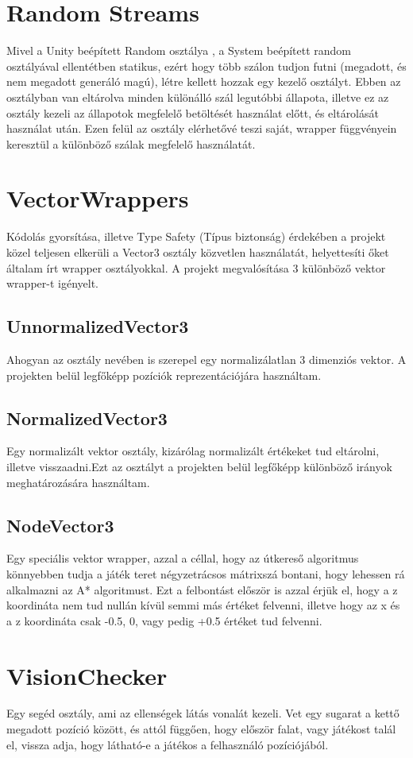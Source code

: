 \documentclass[
]{thesis-ekf}
\theoremstyle{definition}
\theoremstyle{remark}
\begin{document}
	\section{Random Streams}
	Mivel a Unity beépített Random osztálya \cite{unityRandom}, a System beépített random osztályával \cite{systemRandom} ellentétben statikus, ezért hogy több szálon tudjon futni (megadott, és nem megadott generáló magú), létre kellett hozzak egy kezelő osztályt. Ebben az osztályban van eltárolva minden különálló szál legutóbbi állapota, illetve ez az osztály kezeli az állapotok megfelelő betöltését használat előtt, és eltárolását használat után. Ezen felül az osztály elérhetővé teszi saját, wrapper függvényein keresztül a különböző szálak megfelelő használatát.
	\section{VectorWrappers}
	Kódolás gyorsítása, illetve Type Safety (Típus biztonság) érdekében a projekt közel teljesen elkerüli a Vector3 \cite{unityVector3}osztály közvetlen használatát, helyettesíti őket általam írt wrapper osztályokkal. A projekt megvalósítása 3 különböző vektor wrapper-t igényelt.
	\subsection{UnnormalizedVector3}
	Ahogyan az osztály nevében is szerepel egy normalizálatlan 3 dimenziós vektor. A projekten belül legfőképp pozíciók reprezentációjára használtam.
	\subsection{NormalizedVector3}
	Egy normalizált vektor osztály, kizárólag normalizált értékeket tud eltárolni, illetve visszaadni.Ezt az osztályt a projekten belül legfőképp különböző irányok meghatározására használtam.
	\subsection{NodeVector3}
	Egy speciális vektor wrapper, azzal a céllal, hogy az útkereső algoritmus könnyebben tudja a játék teret négyzetrácsos mátrixszá bontani, hogy lehessen rá alkalmazni az A* algoritmust. Ezt a felbontást először is azzal érjük el, hogy a z koordináta nem tud nullán kívül semmi más értéket felvenni, illetve hogy az x és a z koordináta csak -0.5, 0, vagy pedig +0.5 értéket tud felvenni.
	\section{VisionChecker}
	Egy segéd osztály, ami az ellenségek látás vonalát kezeli. Vet egy sugarat a kettő megadott pozíció között, és attól függően, hogy először falat, vagy játékost talál el, vissza adja, hogy látható-e a játékos a felhasználó pozíciójából.
\end{document}
